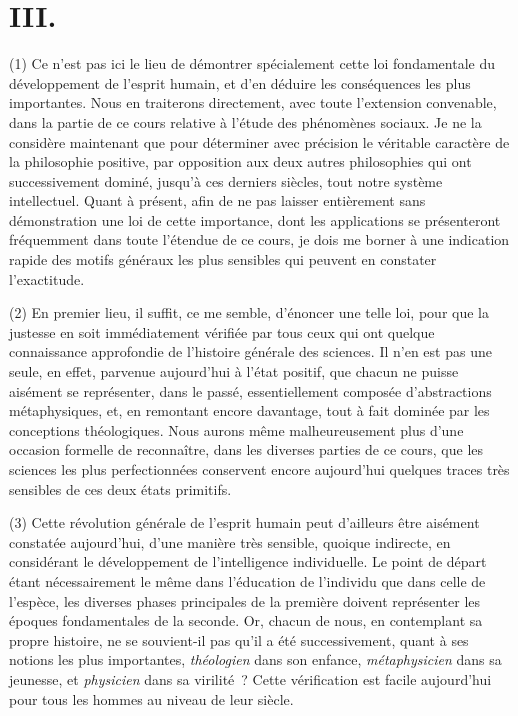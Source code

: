 \documentclass[french,twoside]{book} %
\begin{document}
\section[{III.}]{III.}
\noindent (1) Ce n’est pas ici le lieu de démontrer spécialement cette loi fondamentale du développement de l’esprit humain, et d’en déduire les conséquences les plus importantes. Nous en traiterons directement, avec toute l’extension convenable, dans la partie de ce cours relative à l’étude des phénomènes sociaux. Je ne la considère maintenant que pour déterminer avec précision le véritable caractère de la philosophie positive, par opposition aux deux autres philosophies qui ont successivement dominé, jusqu’à ces derniers siècles, tout notre système intellectuel. Quant à présent, afin de ne pas laisser entièrement sans démonstration une loi de cette importance, dont les applications se présenteront fréquemment dans toute l’étendue de ce cours, je dois me borner à une indication rapide des motifs généraux les plus sensibles qui peuvent en constater l’exactitude.\par
(2) En premier lieu, il suffit, ce me semble, d’énoncer une telle loi, pour que la justesse en soit immédiatement vérifiée par tous ceux qui ont quelque connaissance approfondie de l’histoire générale des sciences. Il n’en est pas une seule, en effet, parvenue aujourd’hui à l’état positif, que chacun ne puisse aisément se représenter, dans le passé, essentiellement composée d’abstractions métaphysiques, et, en remontant encore davantage, tout à fait dominée par les conceptions théologiques. Nous aurons même malheureusement plus d’une occasion formelle de reconnaître, dans les diverses parties de ce cours, que les sciences les plus perfectionnées conservent encore aujourd’hui quelques traces très sensibles de ces deux états primitifs.\par
(3) Cette révolution générale de l’esprit humain peut d’ailleurs être aisément constatée aujourd’hui, d’une manière très sensible, quoique indirecte, en considérant le développement de l’intelligence individuelle. Le point de départ étant nécessairement le même dans l’éducation de l’individu que dans celle de l’espèce, les diverses phases principales de la première doivent représenter les époques fondamentales de la seconde. Or, chacun de nous, en contemplant sa propre histoire, ne se souvient-il pas qu’il a été successivement, quant à ses notions les plus importantes, {\itshape théologien} dans son enfance, {\itshape métaphysicien} dans sa jeunesse, et {\itshape physicien} dans sa virilité ? Cette vérification est facile aujourd’hui pour tous les hommes au niveau de leur siècle.\par
\end{document}
